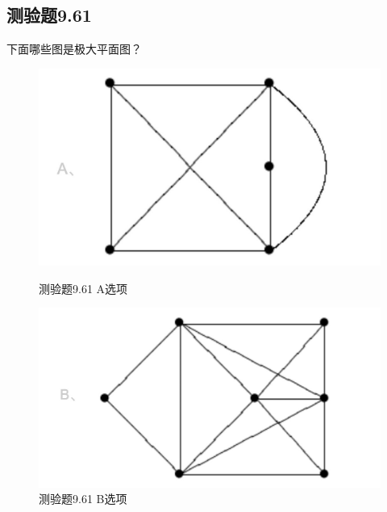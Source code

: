 \documentclass[UTF8, heading=true]{ctexart}
\begin{document}
\subsection{测验题9.61}

下面哪些图是极大平面图？

\begin{figure}[H]
    \centering
    \begin{minipage}[t]{0.35\textwidth}
        \centering
        \includegraphics[width=1\textwidth]{9.61_1.jpg} %
	      \vspace{-0.3cm}
        \caption{测验题9.61 A选项}
    \end{minipage}
	  \hspace{0.1\textwidth} %
    \begin{minipage}[t]{0.35\textwidth}
        \centering
        \includegraphics[width=1\textwidth]{9.61_2.jpg} %
	      \vspace{-0.3cm}
        \caption{测验题9.61 B选项}
\end{minipage}
\end{figure}
\end{document}
